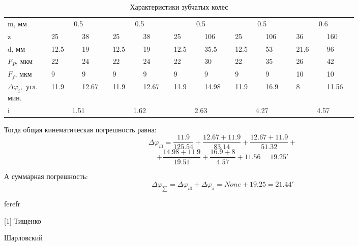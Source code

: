 \documentclass[14pt,a4paper,russian]{scrartcl}
\begin{document}
        \begin{table}[h!]
            \begin{center}
                \begin{tabular}{p{0.1\linewidth}|p{0.07\linewidth}p{0.07\linewidth}p{0.07\linewidth}p{0.07\linewidth}p{0.07\linewidth}p{0.07\linewidth}p{0.07\linewidth}p{0.07\linewidth}p{0.07\linewidth}p{0.07\linewidth}}
                    \hline
                    m, мм  & \multicolumn{2}{c}{0.5} & \multicolumn{2}{c}{0.5} & \multicolumn{2}{c}{0.5} & \multicolumn{2}{c}{0.5} & \multicolumn{2}{c}{0.6} \\
                    z       & 25 &  38 &  25 &  38 &  25 & 106 &   25 &  106 &  36 &  160 \\
                    d, мм   & 12.5 &  19 &  12.5 &  19 &  12.5 & 35.5 &   12.5 &  53 &  21.6 &  96 \\
                    \( F_P \), мкм & 22 & 24 & 22 & 24 & 22 & 30 & 22 & 35 & 26 & 42 \\
                    \( F_f \), мкм & 9 & 9 & 9 & 9 & 9 & 9 & 9 & 9 & 10 & 10 \\
                    \( \Delta\varphi_{i},  \) угл. мин. & 11.9 & 12.67 & 11.9 & 12.67 & 11.9 & 14.98 & 11.9 & 16.9 & 8 & 11.56 \\
                    i  & \multicolumn{2}{c}{1.51} & \multicolumn{2}{c}{1.62} & \multicolumn{2}{c}{2.63} & \multicolumn{2}{c}{4.27} & \multicolumn{2}{c}{4.57} \\
                    \hline
                \end{tabular}
                \caption{{Характеристики зубчатых колес}}\label{tab:gears_digest}
            \end{center}
        \end{table}

        Тогда общая кинематическая погрешность равна:
        \[ \Delta\varphi_{i0} = 
                \frac{11.9}{125.54}
                + \frac{12.67+11.9}{83.14}
                + \frac{12.67+11.9}{51.32}+\]
              \[+ \frac{14.98+11.9}{19.51}
                + \frac{16.9+8}{4.57}
                + 11.56 = 19.25'\]
        
        А суммарная погрешность:
        \[ \Delta\varphi_{\sum} = \Delta\varphi_{i0}  + \Delta\varphi_{\text{л}} 
        = None + 19.25 = 21.44' \]
        
        
        

        
        
        
        
        
        
        
        

        
        
\newpage
        ferefr
\renewcommand\refname{Список использованных источников}

        
[1] Тищенко \par
[2] Шарловский
    
\end{document}
